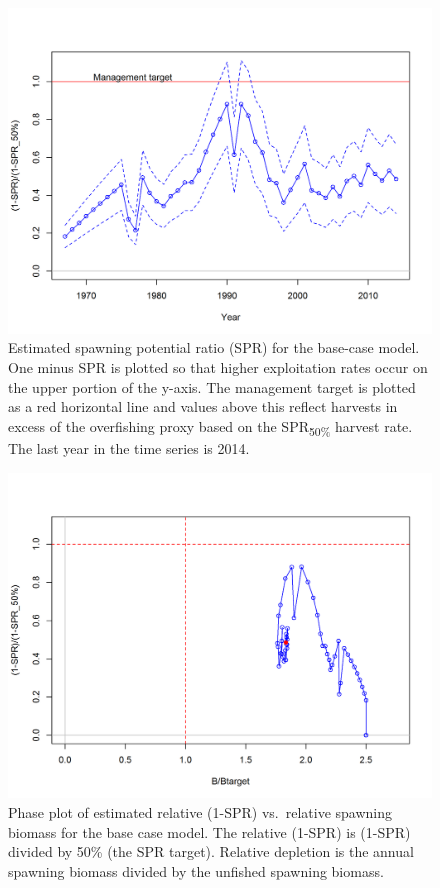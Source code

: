 \documentclass[12pt,]{article}
\begin{document}
\begin{figure}[htbp]
\centering
\includegraphics{r4ss/plots_mod1/SPR3_ratiointerval.png}
\caption{Estimated spawning potential ratio (SPR) for the base-case
model. One minus SPR is plotted so that higher exploitation rates occur
on the upper portion of the y-axis. The management target is plotted as
a red horizontal line and values above this reflect harvests in excess
of the overfishing proxy based on the SPR\textsubscript{50\%} harvest
rate. The last year in the time series is 2014. \label{fig:SPR_all}}
\end{figure}

\begin{figure}[htbp]
\centering
\includegraphics{r4ss/plots_mod1/SPR4_phase.png}
\caption{Phase plot of estimated relative (1-SPR) vs.~relative spawning
biomass for the base case model. The relative (1-SPR) is (1-SPR) divided
by 50\% (the SPR target). Relative depletion is the annual spawning
biomass divided by the unfished spawning biomass. \label{fig:Phase_all}}
\end{figure}
\end{document}
